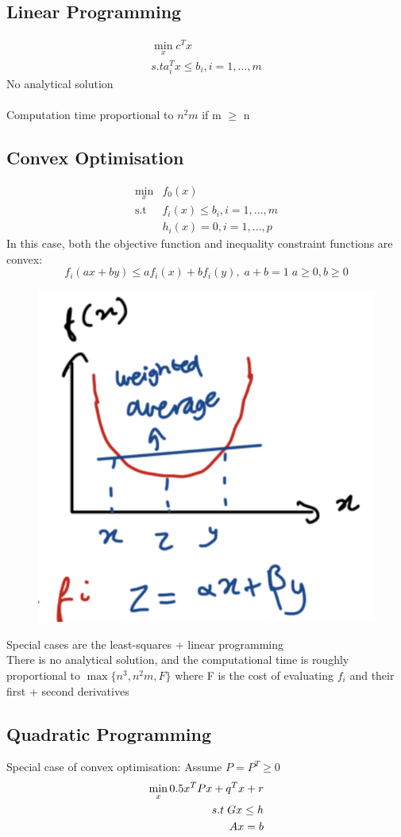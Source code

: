 \documentclass{article}
\begin{document}
\subsection{Linear Programming}
\[ 
\begin{aligned}
\min_x c^T x \\ s.t a_i^T x \leq b_i, i=1,...,m
\end{aligned}
\]
No analytical solution 
\\ \\ Computation time proportional to $n^2m$ if m $\geq$ n
\subsection{Convex Optimisation}
\[
\begin{aligned}
\min_x &f_0(x) \\ \text{s.t}  \; &f_i(x) \leq b_i, i=1,...,m \\ &h_i(x) = 0, i=1,...,p
\end{aligned}
\]
In this case, both the objective function and inequality constraint functions are convex:
\[
f_i(ax + by) \leq af_i(x) + bf_i(y), \; a+b =1 \; a \geq 0, b \geq 0
\]
\begin{figure}[H]
\centering
\includegraphics[width=0.2\linewidth]{Screenshot 2023-01-23 at 17.04.34.png}
\end{figure}
Special cases are the least-squares + linear programming \\ 
There is no analytical solution, and the computational time is roughly proportional to $\max \{n^3,n^2m,F\}$ where F is the cost of evaluating $f_i$ and their first + second derivatives
\subsection{Quadratic Programming}
Special case of convex optimisation: Assume $P = P^T \geq 0$
\[
\centering
\begin{aligned}
\min_x 0.5x^T P x + q^T x + r \\ s.t \;  Gx \leq h \\ Ax = b
\end{aligned}
\]
\end{document}
